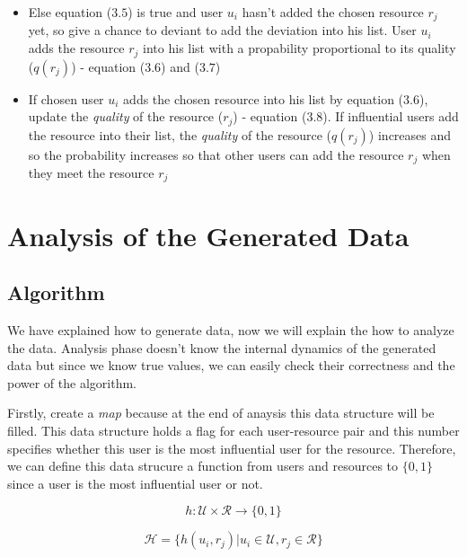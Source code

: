 \documentclass[12pt,a4paper]{report}
\begin{document}
\begin{itemize}
\begin{itemize}
\begin{itemize}
		\item Else equation ($3.5$) is true and user $u_{i}$ hasn't added the chosen resource $r_{j}$ yet, so give a chance to deviant to add the deviation into his list. User $u_{i}$ adds the resource $r_{j}$ into his list with a propability proportional to its quality ($q(r_{j})$) - equation ($3.6$) and ($3.7$)

		\item If chosen user $u_{i}$ adds the chosen resource into his list by equation ($3.6$), update the \emph{quality} of the resource ($r_{j}$) - equation ($3.8$). If influential users add the resource into their list, the \emph{quality} of the resource ($q(r_{j})$) increases and so the probability increases so that other users can add the resource  $r_{j}$ when they meet the resource $r_{j}$

		\end{itemize}

	\end{itemize}

\end{itemize}	

\chapter{Analysis of the Generated Data}

	\section{Algorithm}

	\hspace{0.6cm} We have explained how to generate data, now we will explain the how to analyze the data. Analysis phase doesn't know the internal dynamics of the generated data but since we know true values, we can easily check their correctness and the power of the algorithm.

	\hspace{0.6cm}Firstly, create a \emph{map} because at the end of anaysis this data structure will be filled. This data structure holds a flag for each user-resource pair and this number specifies whether this user is the most influential user for the resource. Therefore, we can define this data strucure a function from users and resources to $\{0,1\}$ since a user is the most influential user or not.

	$$h : \mathcal{U} \times \mathcal{R} \rightarrow \{0, 1\}$$

	$$ \mathcal{H} = \{h(u_{i}, r_{j})| u_{i} \in \mathcal{U}, r_{j} \in \mathcal{R}\}$$
	
\end{document}

